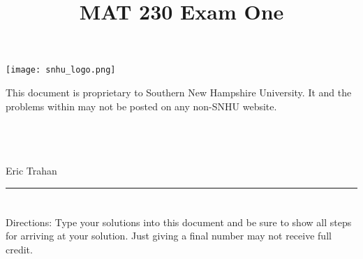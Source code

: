 \documentclass{amsart}
\theoremstyle{definition}
\theoremstyle{Exercise}
\theoremstyle{remark}
\theoremstyle{rule}
\numberwithin{equation}{section}
\begin{document}
\title{\sf MAT 230 Exam One}%


\begin{center}
\texttt{[image: snhu\_logo.png]}
\end{center}

\maketitle
This document is proprietary to Southern New Hampshire University. It and the problems within may not be posted on any non-SNHU website.\\\\\\\\
\begin{center}
Eric Trahan
\end{center}

\begin{center}
\rule{\textwidth}{0.4pt}
\end{center}
\newpage
\section*{}
\section*{}
Directions: Type your solutions into this document and be sure to show all steps for arriving at your solution. Just giving a final number may not receive full credit.
\\
\end{document}
